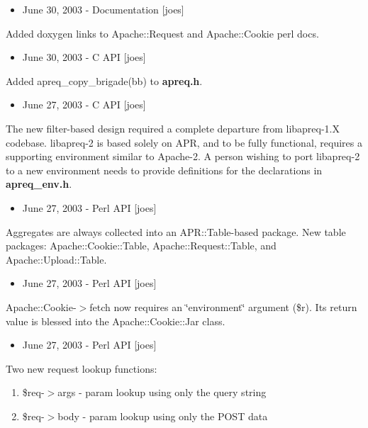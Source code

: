 \begin{itemize}
\item June 30, 2003 - Documentation [joes]\end{itemize}


Added doxygen links to Apache::Request and Apache::Cookie perl docs.

\begin{itemize}
\item June 30, 2003 - C API [joes]\end{itemize}


Added apreq\_\-copy\_\-brigade(bb) to {\bf apreq.h}.

\begin{itemize}
\item June 27, 2003 - C API [joes]\end{itemize}


The new filter-based design required a complete departure from libapreq-1.X codebase. libapreq-2 is based solely on APR, and to be fully functional, requires a supporting environment similar to Apache-2. A person wishing to port libapreq-2 to a new environment needs to provide definitions for the declarations in {\bf apreq\_\-env.h}.

\begin{itemize}
\item June 27, 2003 - Perl API [joes]\end{itemize}


Aggregates are always collected into an APR::Table-based package. New table packages: Apache::Cookie::Table, Apache::Request::Table, and Apache::Upload::Table.

\begin{itemize}
\item June 27, 2003 - Perl API [joes]\end{itemize}


Apache::Cookie-$>$fetch now requires an \char`\"{}environment\char`\"{} argument (\$r). Its return value is blessed into the Apache::Cookie::Jar class.

\begin{itemize}
\item June 27, 2003 - Perl API [joes]\end{itemize}


Two new request lookup functions:\begin{enumerate}
\item \$req-$>$args - param lookup using only the query string\item \$req-$>$body - param lookup using only the POST data\end{enumerate}
